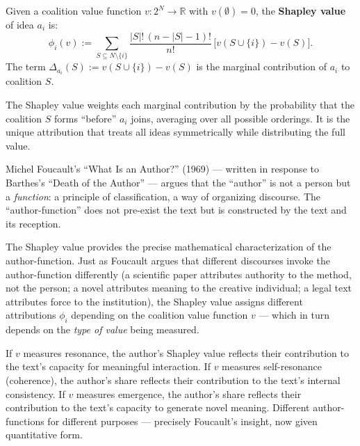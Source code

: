 \begin{definition}
\label{def:shapley-value}
Given a coalition value function $v\colon 2^N \to \mathbb{R}$ with $v(\emptyset) = 0$,
the \textbf{Shapley value} of idea $a_i$ is:
\[
  \phi_i(v) := \sum_{S \subseteq N \setminus \{i\}}
  \frac{|S|!\,(n - |S| - 1)!}{n!}\,
  \bigl[v(S \cup \{i\}) - v(S)\bigr].
\]
The term $\Delta_{a_i}(S) := v(S \cup \{i\}) - v(S)$ is the marginal
contribution of $a_i$ to coalition $S$.
\end{definition}

\begin{remark}
The Shapley value weights each marginal contribution by the probability that
the coalition $S$ forms ``before'' $a_i$ joins, averaging over all possible
orderings.  It is the unique attribution that treats all ideas symmetrically
while distributing the full value.
\end{remark}

\begin{interpretation}
\label{interp:ch21:foucault_author_function}
Michel Foucault's ``What Is an Author?'' (1969) --- written in response to
Barthes's ``Death of the Author'' --- argues that the ``author'' is not a
person but a \emph{function}: a principle of classification, a way of
organizing discourse.  The ``author-function'' does not pre-exist the text
but is constructed by the text and its reception.

The Shapley value provides the precise mathematical characterization of
the author-function.  Just as Foucault argues that different discourses
invoke the author-function differently (a scientific paper attributes
authority to the method, not the person; a novel attributes meaning to
the creative individual; a legal text attributes force to the institution),
the Shapley value assigns different attributions $\phi_i$ depending on
the coalition value function $v$ --- which in turn depends on the
\emph{type of value} being measured.

If $v$ measures resonance, the author's Shapley value reflects their
contribution to the text's capacity for meaningful interaction.  If $v$
measures self-resonance (coherence), the author's share reflects their
contribution to the text's internal consistency.  If $v$ measures
emergence, the author's share reflects their contribution to the
text's capacity to generate novel meaning.  Different author-functions
for different purposes --- precisely Foucault's insight, now given
quantitative form.
\end{interpretation}

